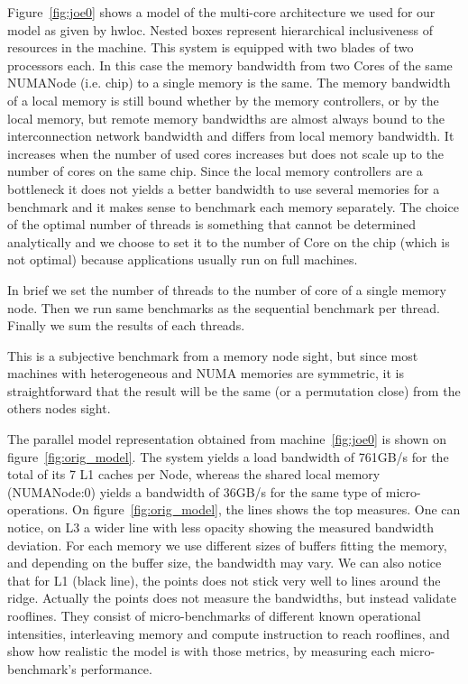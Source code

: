 \documentclass[twoside,twocolumn,8pt]{extarticle}
\begin{document}
Figure~\ref{fig:joe0} shows a model of the multi-core architecture we used for our model as given by hwloc.
Nested boxes represent hierarchical inclusiveness of resources in the machine.
This system is equipped with two blades of two processors each.
In this case the memory bandwidth from two Cores of the same NUMANode (i.e. chip) to a single memory is the same.
The memory bandwidth of a local memory is still bound whether by the memory controllers, or by the local memory, but remote memory
bandwidths are almost always bound to the interconnection network bandwidth and differs from local memory bandwidth.
It increases when the number of used cores increases but does not scale up to the number of cores on the same chip.
Since the local memory controllers are a bottleneck it does not yields a better bandwidth to use several memories for a
benchmark and it makes sense to benchmark each memory separately.
The choice of the optimal number of threads is something that cannot be determined analytically and we choose to
set it to the number of Core on the chip (which is not optimal) because applications usually run on full machines.

In brief we set the number of threads to the number of core of a single memory node. Then we run same benchmarks as the sequential
benchmark per thread. Finally we sum the results of each threads.

This is a subjective benchmark from a memory node sight, but since most machines with heterogeneous and NUMA memories are
symmetric, it is straightforward that the result will be the same (or a permutation close) from the others nodes sight.

The parallel model representation obtained from machine~\ref{fig:joe0} is shown on figure~\ref{fig:orig_model}.
The system yields a load bandwidth of 761GB/s for the total of its 7 L1 caches per Node, whereas the shared local memory
(NUMANode:0) yields a bandwidth of 36GB/s for the same type of micro-operations.
On figure~\ref{fig:orig_model}, the lines shows the top measures.
One can notice, on L3 a wider line with less opacity showing the measured bandwidth deviation.
For each memory we use different sizes of buffers fitting the memory, and depending on the buffer size, the bandwidth may vary.
We can also notice that for L1 (black line), the points does not stick very well to lines around the ridge. Actually the points
does not measure the bandwidths, but instead validate rooflines. They consist of micro-benchmarks of different known operational
intensities, interleaving memory and compute instruction to reach rooflines, and show how realistic the model is with those
metrics, by measuring each micro-benchmark's performance.
\end{document}
